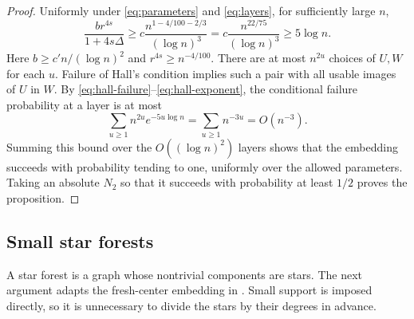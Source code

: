 \begin{proof}
Uniformly under \eqref{eq:parameters} and \eqref{eq:layers},
for sufficiently large $n$,
\begin{equation}\label{eq:hall-exponent}
 \frac{b r^{4s}}{1+4s\Delta}
 \geq c\frac{n^{1-4/100-2/3}}{(\log n)^3}
 =c\frac{n^{22/75}}{(\log n)^3}\geq5\log n.
\end{equation}
Here $b\geq c'n/(\log n)^2$ and $r^{4s}\geq n^{-4/100}$.
There are at most $n^{2u}$ choices of $U,W$ for each $u$.
Failure of Hall's condition implies such a pair with all usable
images of $U$ in $W$. By \eqref{eq:hall-failure}--\eqref{eq:hall-exponent},
the conditional failure probability at a layer is at most
\[
 \sum_{u\geq1}n^{2u}e^{-5u\log n}
 =\sum_{u\geq1}n^{-3u}=O(n^{-3}).
\]
Summing this bound over the $O((\log n)^2)$ layers shows that
the embedding succeeds with probability tending to one,
uniformly over the allowed parameters. Taking an absolute
$N_2$ so that it succeeds with probability at least $1/2$
proves the proposition.
\end{proof}

\subsection{Small star forests}

A star forest is a graph whose nontrivial components are stars.
The next argument adapts the fresh-center embedding in
\cite[Claim~6.6]{AHPT26}. Small support is imposed directly,
so it is unnecessary to divide the stars by their degrees in
advance.

